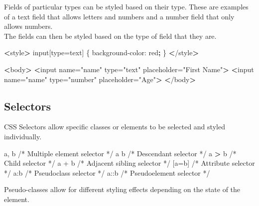 \documentclass[]{book}
\newenvironment{Shaded}{\begin{snugshade}}{\end{snugshade}}
\newcommand{\KeywordTok}[1]{\textcolor[rgb]{0.13,0.29,0.53}{\textbf{#1}}}
\newcommand{\StringTok}[1]{\textcolor[rgb]{0.31,0.60,0.02}{#1}}
\newcommand{\VariableTok}[1]{\textcolor[rgb]{0.00,0.00,0.00}{#1}}
\newcommand{\OperatorTok}[1]{\textcolor[rgb]{0.81,0.36,0.00}{\textbf{#1}}}
\newcommand{\ExtensionTok}[1]{#1}
\newcommand{\NormalTok}[1]{#1}
\begin{document}
Fields of particular types can be styled based on their type. These are
examples of a text field that allows letters and numbers and a number
field that only allows numbers.\\
The fields can then be styled based on the type of field that they are.

\begin{Shaded}
\begin{Highlighting}[]
\OperatorTok{<}\ExtensionTok{style}\OperatorTok{>}
    \ExtensionTok{input}\NormalTok{[type=text] \{}
    \ExtensionTok{background-color}\NormalTok{: red}\KeywordTok{;}
\NormalTok{\}}
\OperatorTok{<}\NormalTok{/}\ExtensionTok{style}\OperatorTok{>}

\OperatorTok{<}\ExtensionTok{body}\OperatorTok{>}
    \OperatorTok{<}\ExtensionTok{input}\NormalTok{ name=}\StringTok{"name"}\NormalTok{ type=}\StringTok{"text"}\NormalTok{ placeholder=}\StringTok{"First Name"}\OperatorTok{>}
    \OperatorTok{<}\ExtensionTok{input}\NormalTok{ name=}\StringTok{"name"}\NormalTok{ type=}\StringTok{"number"}\NormalTok{ placeholder=}\StringTok{"Age"}\OperatorTok{>}
\OperatorTok{<}\NormalTok{/}\ExtensionTok{body}\OperatorTok{>}
\end{Highlighting}
\end{Shaded}

\subsection{Selectors}\label{selectors}

CSS Selectors allow specific classes or elements to be selected and
styled individually.

\begin{Shaded}
\begin{Highlighting}[]
\ExtensionTok{a}\NormalTok{, b /* Multiple element selector */}
\ExtensionTok{a}\NormalTok{ b /* Descendant selector */}
\ExtensionTok{a} \OperatorTok{>}\NormalTok{ b /* Child selector */}
\ExtensionTok{a}\NormalTok{ + b /* Adjacent sibling selector */}
\NormalTok{[}\VariableTok{a=}\NormalTok{b] }\ExtensionTok{/*}\NormalTok{ Attribute selector */}
\ExtensionTok{a}\NormalTok{:b /* Pseudoclass selector */}
\ExtensionTok{a}\NormalTok{::b /* Pseudoelement selector */}
\end{Highlighting}
\end{Shaded}

Pseudo-classes allow for different styling effects depending on the
state of the element.
\end{document}
